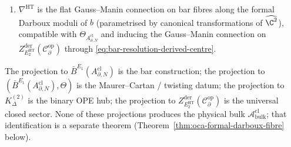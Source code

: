 \begin{thm}
\begin{enumerate}[label=\textup{(\roman*)}]
\begin{equation}
          Z^{\mathrm{der}}_{E_2^{\mathrm{HT}}}\!\bigl(
            \mathcal C^{\mathrm{op}}_\partial\bigr)\big|_b
          \;\simeq\;
          \RHom_{A^{\mathrm{cl}}_{\partial,N}\otimes
                 (A^{\mathrm{cl}}_{\partial,N})^{\mathrm{op}}}\!\bigl(
            A^{\mathrm{cl}}_{\partial,N},
            A^{\mathrm{cl}}_{\partial,N}\bigr)
          \;\simeq\;
          HH^\bullet_{\mathrm{adm}}\!\bigl(
            A^{\mathrm{cl}}_{\partial,N},
            A^{\mathrm{cl}}_{\partial,N}\bigr),
\end{equation}
        equivalently the chiral Hochschild brace dg algebra of
        \(A^{\mathrm{cl}}_{\partial,N}\); the global object is obtained
        by gluing this stalk along \(\partial X\) through
        Theorem~\ref{thm:main-global-conditional}; and
  \item \(\nabla^{\mathrm{HT}}\) is the flat Gauss--Manin connection on
        bar fibres along the formal Darboux moduli of \(b\)
        (parametrised by canonical transformations of \(\widehat{\C^2}\)),
        compatible with \(\Theta_{A^{\mathrm{cl}}_{\partial,N}}\) and
        inducing the Gauss--Manin connection on
        \(Z^{\mathrm{der}}_{E_2^{\mathrm{HT}}}(\mathcal C^{\mathrm{op}}_\partial)\)
        through \eqref{eq:bar-resolution-derived-centre}.
\end{enumerate}
The projection to \(\bar B^{E_1}(A^{\mathrm{cl}}_{\partial,N})\) is
the bar construction; the projection to
\((\bar B^{E_1}(A^{\mathrm{cl}}_{\partial,N}),\Theta)\) is the
Maurer--Cartan / twisting datum; the projection to \(K^{(2)}_\Delta\)
is the binary OPE hub; the projection to
\(Z^{\mathrm{der}}_{E_2^{\mathrm{HT}}}(\mathcal C^{\mathrm{op}}_\partial)\)
is the universal closed sector.  None of these projections produces
the physical bulk \(\mathcal A^{\mathrm{cl}}_{\mathrm{bulk}}\); that
identification is a separate theorem
(Theorem~\ref{thm:oca-formal-darboux-fibre} below).
\end{thm}

